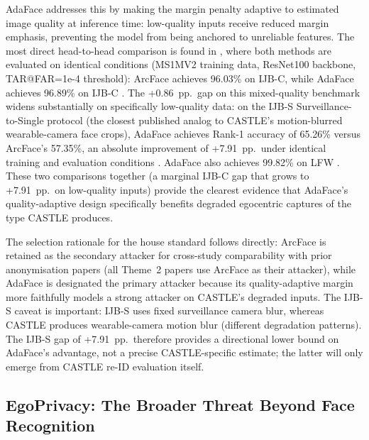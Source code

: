 \documentclass[12pt, onecolumn]{IEEEtran}
\begin{document}
AdaFace \cite{kim2022adaface} addresses this by making the margin
penalty adaptive to estimated image quality at inference time:
low-quality inputs receive reduced margin emphasis, preventing the model
from being anchored to unreliable features. The most direct
head-to-head comparison is found in \cite{kim2022adaface}, where both
methods are evaluated on identical conditions (MS1MV2 training data,
ResNet100 backbone, TAR@FAR=1e-4 threshold): ArcFace achieves 96.03\% on
IJB-C, while AdaFace achieves 96.89\% on IJB-C \cite{kim2022adaface}.
The +0.86~pp.\  gap on this mixed-quality benchmark widens substantially
on specifically low-quality data: on the IJB-S Surveillance-to-Single
protocol (the closest published analog to CASTLE's motion-blurred
wearable-camera face crops), AdaFace achieves Rank-1 accuracy of 65.26\%
versus ArcFace's 57.35\%, an absolute improvement of +7.91~pp.\  under
identical training and evaluation conditions \cite{kim2022adaface}.
AdaFace also achieves 99.82\% on LFW \cite{kim2022adaface}. These two
comparisons together (a marginal IJB-C gap that grows to +7.91~pp.\  on
low-quality inputs) provide the clearest evidence that AdaFace's
quality-adaptive design specifically benefits degraded egocentric
captures of the type CASTLE produces.

The selection rationale for the house standard follows directly: ArcFace
\cite{deng2019arcface} is retained as the secondary attacker for
cross-study comparability with prior anonymisation papers (all Theme~2
papers use ArcFace as their attacker), while AdaFace
\cite{kim2022adaface} is designated the primary attacker because its
quality-adaptive margin more faithfully models a strong attacker on
CASTLE's degraded inputs. The IJB-S caveat is important: IJB-S uses
fixed surveillance camera blur, whereas CASTLE produces wearable-camera
motion blur (different degradation patterns). The IJB-S gap of
+7.91~pp.\  therefore provides a directional lower bound on AdaFace's
advantage, not a precise CASTLE-specific estimate; the latter will only
emerge from CASTLE re-ID evaluation itself.


\subsection{EgoPrivacy: The Broader Threat Beyond Face Recognition}
\end{document}
